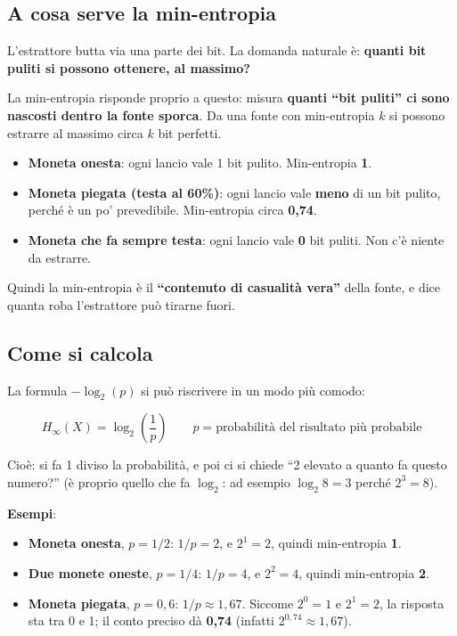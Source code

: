\subsection{A cosa serve la min-entropia}

L'estrattore butta via una parte dei bit. La domanda naturale è: \textbf{quanti bit puliti si possono ottenere, al massimo?}

La min-entropia risponde proprio a questo: misura \textbf{quanti ``bit puliti'' ci sono nascosti dentro la fonte sporca}. Da una fonte con min-entropia \(k\) si possono estrarre al massimo circa \(k\) bit perfetti.

\begin{itemize}
\tightlist
\item
  \textbf{Moneta onesta}: ogni lancio vale 1 bit pulito. Min-entropia \textbf{1}.
\item
  \textbf{Moneta piegata (testa al 60\%)}: ogni lancio vale \textbf{meno} di un bit pulito, perché è un po' prevedibile. Min-entropia circa \textbf{0,74}.
\item
  \textbf{Moneta che fa sempre testa}: ogni lancio vale \textbf{0} bit puliti. Non c'è niente da estrarre.
\end{itemize}

Quindi la min-entropia è il \textbf{``contenuto di casualità vera''} della fonte, e dice quanta roba l'estrattore può tirarne fuori.

\subsection{Come si calcola}

La formula \(-\log_2(p)\) si può riscrivere in un modo più comodo:

\[
H_\infty(X) = \log_2\!\left(\frac{1}{p}\right) \qquad p = \text{probabilità del risultato più probabile}
\]

Cioè: si fa 1 diviso la probabilità, e poi ci si chiede ``2 elevato a quanto fa questo numero?'' (è proprio quello che fa \(\log_2\): ad esempio \(\log_2 8 = 3\) perché \(2^3 = 8\)).

\begin{esempio}

\textbf{Esempi}:

\begin{itemize}
\tightlist
\item
  \textbf{Moneta onesta}, \(p = 1/2\): \(1/p = 2\), e \(2^1 = 2\), quindi min-entropia \textbf{1}.
\item
  \textbf{Due monete oneste}, \(p = 1/4\): \(1/p = 4\), e \(2^2 = 4\), quindi min-entropia \textbf{2}.
\item
  \textbf{Moneta piegata}, \(p = 0{,}6\): \(1/p \approx 1{,}67\). Siccome \(2^0 = 1\) e \(2^1 = 2\), la risposta sta tra 0 e 1; il conto preciso dà \textbf{0,74} (infatti \(2^{0{,}74} \approx 1{,}67\)).
\end{itemize}

\end{esempio}

